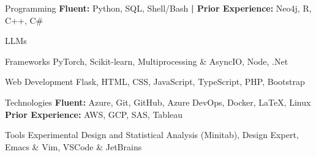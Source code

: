 

\begin{cvskills}


\cvskill
    {Programming} %
        {\textbf{Fluent:} Python, SQL, Shell/Bash \textbf{| Prior Experience:} Neo4j, R, C++, C\#} %


\cvskill
    {LLMs} %
    {} %


\cvskill
    {Frameworks} %
    {PyTorch, Scikit-learn,  Multiprocessing \& AsyncIO, Node, .Net} %


\cvskill
    {Web Development} %
    {Flask, HTML, CSS, JavaScript, TypeScript, PHP, Bootstrap} %
    

\cvskill
    {Technologies} %
    {\textbf{Fluent:} Azure, Git, GitHub, Azure DevOps, Docker, LaTeX, Linux
    \newline
    \textbf{Prior Experience:} AWS, GCP, SAS, Tableau} %
    


\cvskill
    {Tools}
    {Experimental Design and Statistical Analysis (Minitab), Design Expert, Emacs \& Vim, VSCode \& JetBrains}





    
\end{cvskills}

